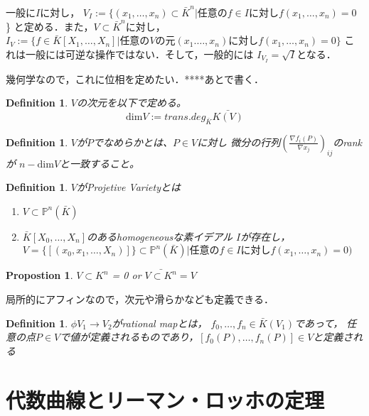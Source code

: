 \documentclass{ujarticle}
\newtheorem{dfn}[thm]{Definition}
\newtheorem{prop}[thm]{Propostion}
\begin{document}
一般に$I$に対し，
$V_I:=\{ (x_1,\dots,x_n)  \subset \bar{K}^n |
\mbox{任意の}f \in I \mbox{に対し} f(x_1,\dots,x_n)=0$ \}
と定める．また，$V \subset \bar{K}^n$に対し，
$I_V:=\{ f \in \bar{K}[X_1,\dots,X_n] | \mbox{任意の}V
\mbox{の元}(x_1.\dots,x_n)\mbox{に対し}f(x_1,\dots,x_n)=0 \} $
これは一般には可逆な操作ではない．そして，一般的には
$I_{V_I}=\sqrt{I}$となる．

幾何学なので，これに位相を定めたい．****あとで書く．

\begin{dfn}
  $V$の次元を以下で定める。
  \begin{equation*}
    \mathrm{dim}V:=trans.deg_{\bar{K}}\bar{K(V)}
  \end{equation*}
\end{dfn}

\begin{dfn}
 $V$が$P$でなめらかとは、$P \in V$に対し
 微分の行列$(\frac{\nabla f_i(P)}{\nabla x_j})_{ij}$のrankが
 $n- \mathrm{dim} V$と一致すること。
\end{dfn}

\begin{dfn}
$V$がProjetive Varietyとは
\begin{enumerate}
  \item $V \subset \mathbb{P}^n(\bar{K})$
  \item $\bar{K}[X_0,\dots,X_n]$のあるhomogeneousな素イデアル
           $I$が存在し，$V = \{ [(x_0,x_1, \dots,X_n)] \} \subset
           \mathbb{P}^n(\bar{K}) | \mbox{任意の}f \in I
           \mbox{に対し}f(x_1,\dots,x_n)=0)$
\end{enumerate}
\end{dfn}
\begin{prop}
 $V \subset K^n$ = 0 or $\bar{V \subset K^n} = V$
\end{prop}

局所的にアフィンなので，次元や滑らかなども定義できる．

\begin{dfn}
  $ \phi V_1 \to V_2$がrational mapとは，
  $f_0,\dots,f_n \in \bar{K}(V_1)$であって，
  任意の点$P \in V$で値が定義されるものであり，$[f_0(P), \dots , f_n(P)] \in
  V$と定義される
\end{dfn}

\section{代数曲線とリーマン・ロッホの定理}
\label{sec:代数曲線とリーマン・ロッホの定理}
\end{document}
